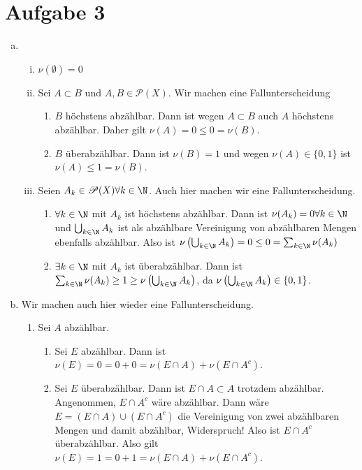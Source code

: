 \documentclass{article}
\begin{document}
    \section*{Aufgabe 3}
    \begin{enumerate}[(a)]
        \item \begin{enumerate}[(i)]
            \item $\nu(\emptyset) = 0$
            \item Sei $A\subset B$ und $A, B \in \mathscr P(X)$. Wir machen eine Fallunterscheidung
            \begin{enumerate}[1.]
                \item $B$ höchstens abzählbar. Dann ist wegen $A\subset B$ auch $A$ höchstens abzählbar. Daher gilt $\nu(A) = 0 \leq 0 = \nu(B)$.
                \item $B$ überabzählbar. Dann ist $\nu(B) = 1$ und wegen $\nu(A) \in \{0,1\}$ ist $\nu(A) \leq 1 = \nu(B)$.
            \end{enumerate}
            \item Seien $A_k \in \mathscr P(X) \forall k \in \N$. Auch hier machen wir eine Fallunterscheidung.
            \begin{enumerate}[1.]
                \item $\forall k\in \N$ mit $A_k$ ist höchstens abzählbar. Dann ist $\nu(A_k) = 0 \forall k \in \N$ und $\bigcup_{k\in \N} A_k$ ist als abzählbare Vereinigung von abzählbaren Mengen ebenfalls abzählbar. Also ist $\nu\left(\bigcup_{k\in \N} A_k\right) = 0 \leq 0 = \sum_{k \in \N} \nu(A_k)$
                \item $\exists k \in \N$ mit $A_k$ ist überabzählbar. Dann ist $\sum_{k \in \N} \nu(A_k) \geq 1 \geq \nu\left(\bigcup_{k\in \N} A_k\right)$, da $\nu\left(\bigcup_{k\in \N} A_k\right) \in \{0,1\}$.
            \end{enumerate}
        \end{enumerate}
        \item Wir machen auch hier wieder eine Fallunterscheidung.
        \begin{enumerate}[1.]
            \item Sei $A$ abzählbar. \begin{enumerate}
                \item Sei $E$ abzählbar. Dann ist $\nu(E) = 0 = 0 + 0 = \nu(E \cap A) + \nu(E\cap A^c)$.
                \item Sei $E$ überabzählbar. Dann ist $E \cap A\subset A$ trotzdem abzählbar. Angenommen, $E \cap A^c$ wäre abzählbar. Dann wäre $E =(E \cap A) \cup (E \cap A^c)$ die Vereinigung von zwei abzählbaren Mengen und damit abzählbar, Widerspruch! Also ist $E \cap A^c$ überabzählbar. Also gilt $\nu(E) = 1 = 0 + 1 = \nu(E \cap A) + \nu(E \cap A^c)$.

\end{enumerate}
\end{enumerate}
\end{enumerate}
\end{document}

